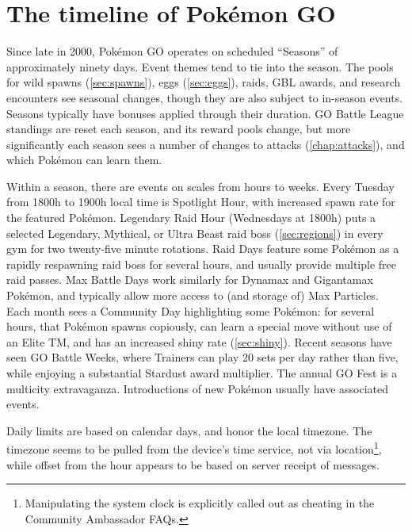\section{The timeline of Pokémon GO\label{sec:timeline}}
Since late in 2000, Pokémon GO operates on scheduled ``Seasons'' of approximately ninety days.
Event themes tend to tie into the season.
The pools for wild spawns (\autoref{sec:spawns}), eggs (\autoref{sec:eggs}), raids, GBL awards,
 and research encounters see seasonal changes, though they are also subject to in-season events.
Seasons typically have bonuses applied through their duration.
GO Battle League standings are reset each season, and its reward pools change, but
 more significantly each season sees a number of changes to attacks (\autoref{chap:attacks}),
 and which Pokémon can learn them.

Within a season, there are events on scales from hours to weeks.
Every Tuesday from 1800h to 1900h local time is Spotlight Hour, with
 increased spawn rate for the featured Pokémon.
Legendary Raid Hour (Wednesdays at 1800h) puts a selected Legendary, Mythical,
 or Ultra Beast raid boss (\autoref{sec:regions}) in every gym for two
 twenty-five minute rotations.
Raid Days feature some Pokémon as a rapidly respawning raid boss for several hours,
 and usually provide multiple free raid passes.
Max Battle Days work similarly for Dynamax and Gigantamax Pokémon, and typically
 allow more access to (and storage of) Max Particles.
Each month sees a Community Day highlighting some Pokémon: for several hours,
 that Pokémon spawns copiously, can learn a special move without use of an
 Elite TM, and has an increased shiny rate (\autoref{sec:shiny}).
Recent seasons have seen GO Battle Weeks, where Trainers can play 20 sets
 per day rather than five, while enjoying a substantial Stardust award multiplier.
The annual GO Fest is a multicity extravaganza.
Introductions of new Pokémon usually have associated events.

Daily limits are based on calendar days, and honor the local timezone.
The timezone seems to be pulled from the device's time service, not via location\footnote{Manipulating
 the system clock is explicitly called out as cheating in the Community Ambassador FAQs.},
 while offset from the hour appears to be based on server receipt of messages.

